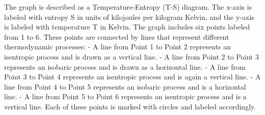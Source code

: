 The graph is described as a Temperature-Entropy (T-S) diagram. The x-axis is labeled with entropy S in units of kilojoules per kilogram Kelvin, and the y-axis is labeled with temperature T in Kelvin. The graph includes six points labeled from 1 to 6. These points are connected by lines that represent different thermodynamic processes:
- A line from Point 1 to Point 2 represents an isentropic process and is drawn as a vertical line.
- A line from Point 2 to Point 3 represents an isobaric process and is drawn as a horizontal line.
- A line from Point 3 to Point 4 represents an isentropic process and is again a vertical line.
- A line from Point 4 to Point 5 represents an isobaric process and is a horizontal line.
- A line from Point 5 to Point 6 represents an isentropic process and is a vertical line.
Each of these points is marked with circles and labeled accordingly.
